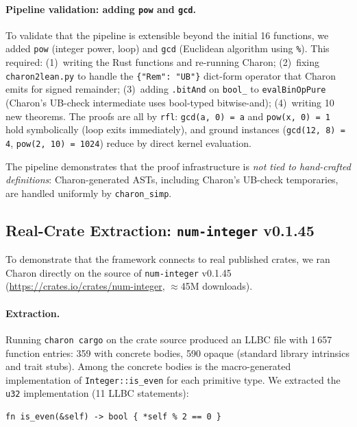 \paragraph{Pipeline validation: adding \texttt{pow} and \texttt{gcd}.}
To validate that the pipeline is extensible beyond the initial 16 functions,
we added \texttt{pow} (integer power, loop) and \texttt{gcd}
(Euclidean algorithm using \texttt{\%}).
This required: (1)~writing the Rust functions and re-running Charon;
(2)~fixing \texttt{charon2lean.py} to handle the \texttt{\{"Rem": "UB"\}}
dict-form operator that Charon emits for signed remainder;
(3)~adding \texttt{.bitAnd} on \texttt{bool\_} to \texttt{evalBinOpPure}
(Charon's UB-check intermediate uses bool-typed bitwise-and);
(4)~writing 10 new theorems.
The proofs are all by \texttt{rfl}: \texttt{gcd(a, 0) = a} and
\texttt{pow(x, 0) = 1} hold symbolically (loop exits immediately),
and ground instances (\texttt{gcd(12, 8) = 4}, \texttt{pow(2, 10) = 1024})
reduce by direct kernel evaluation.

The pipeline demonstrates that the proof infrastructure is \emph{not tied to
hand-crafted definitions}: Charon-generated ASTs, including Charon's
UB-check temporaries, are handled uniformly by \texttt{charon\_simp}.

\subsection{Real-Crate Extraction: \texttt{num-integer} v0.1.45}
\label{sec:eval-numinteger}

To demonstrate that the framework connects to real published crates, we
ran Charon directly on the source of \texttt{num-integer} v0.1.45
(\url{https://crates.io/crates/num-integer}, $\approx$45M downloads).

\paragraph{Extraction.}
Running \texttt{charon cargo} on the crate source produced an LLBC file
with 1\,657 function entries: 359 with concrete bodies, 590 opaque
(standard library intrinsics and trait stubs).
Among the concrete bodies is the macro-generated implementation of
\texttt{Integer::is\_even} for each primitive type.
We extracted the \texttt{u32} implementation (11 LLBC statements):

\begin{lstlisting}[caption={Source: num-integer/src/lib.rs (impl\_integer\_for\_usize! macro).},
                   label={lst:iseven}]
fn is_even(&self) -> bool { *self % 2 == 0 }
\end{lstlisting}

